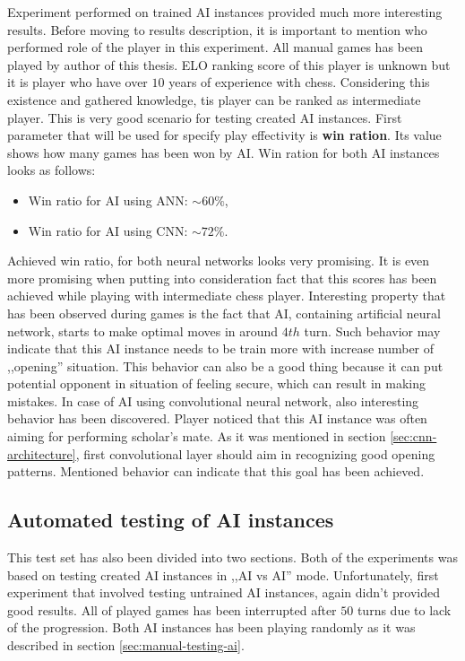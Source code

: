 Experiment performed on trained AI instances provided much more interesting results. Before moving to results description, it is important to mention who performed role of the player in this experiment. All manual games has been played by author of this thesis. ELO ranking score of this player is unknown but it is player who have over $10$ years of experience with chess. Considering this existence and gathered knowledge, tis player can be ranked as intermediate player. This is very good scenario for testing created AI instances. First parameter that will be used for specify play effectivity is \textbf{win ration}. Its value shows how many games has been won by AI. Win ration for both AI instances looks as follows:
\begin{itemize}
    \item Win ratio for AI using ANN: $\sim 60\%$,
    \item Win ratio for AI using CNN: $\sim 72\%$.
\end{itemize}
Achieved win ratio, for both neural networks looks very promising. It is even more promising when putting into consideration fact that this scores has been achieved while playing with intermediate chess player. Interesting property that has been observed during games is the fact that AI, containing artificial neural network, starts to make optimal moves in around $4th$ turn. Such behavior may indicate that this AI instance needs to be train more with increase number of ,,opening'' situation. This behavior can also be a good thing because it can put potential opponent in situation of feeling secure, which can result in making mistakes. In case of AI using convolutional neural network, also interesting behavior has been discovered. Player noticed that this AI instance was often aiming for performing scholar's mate. As it was mentioned in section \ref{sec:cnn-architecture}, first convolutional layer should aim in recognizing good opening patterns. Mentioned behavior can indicate that this goal has been achieved.

\subsection{Automated testing of AI instances}
This test set has also been divided into two sections. Both of the experiments was based on testing created AI instances in ,,AI vs AI'' mode. Unfortunately, first experiment that involved testing untrained AI instances, again didn't provided good results. All of played games has been interrupted after $50$ turns due to lack of the progression. Both AI instances has been playing randomly as it was described in section \ref{sec:manual-testing-ai}.

